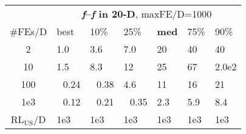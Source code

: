\begin{tabular}{c|llllll}
 & \multicolumn{6}{|c}{\textbf{\textit{f}\raisebox{-0.35ex}{1}--\textit{f}\raisebox{-0.35ex}{55} in 20-D}, maxFE/D=1000}\\
\#FEs/D & best & 10\% & 25\% & \textbf{med} & 75\% & 90\%\\
2 & \hspace*{1ex}1.0 & \hspace*{1ex}3.6 & \hspace*{1ex}7.0 & 20 & 40 & 40\\
10 & \hspace*{1ex}1.5 & \hspace*{1ex}8.3 & 12 & 25 & 67 & 2.0e2\\
100 & ~\,0.24 & ~\,0.38 & \hspace*{1ex}4.6 & 11 & 16 & 21\\
1e3 & ~\,0.12 & ~\,0.21 & ~\,0.35 & \hspace*{1ex}2.3 & \hspace*{1ex}5.9 & \hspace*{1ex}8.4\\
$\text{RL}_{\text{US}}$/D & 1e3 & 1e3 & 1e3 & 1e3 & 1e3 & 1e3
\end{tabular}
